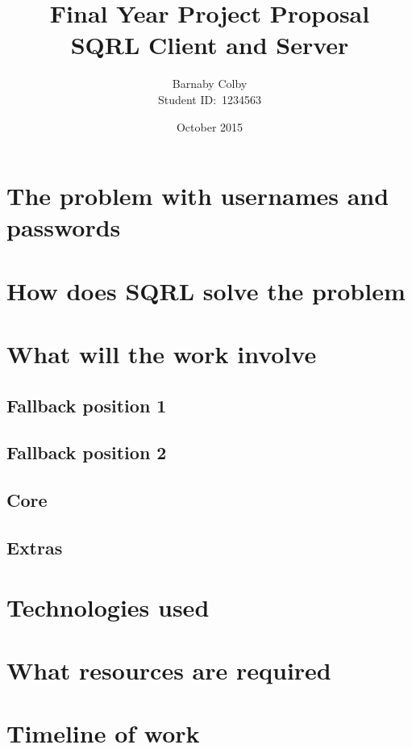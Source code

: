 \documentclass[a4paper,11pt]{article} %
\begin{document}
\title{Final Year Project Proposal\\SQRL Client and Server}
\author{Barnaby Colby\\
Student ID:\ 1234563}
\date{October 2015}
\maketitle



\section*{The problem with usernames and passwords} 
\section*{How does SQRL solve the problem} 
\section*{What will the work involve} 
    \subsection*{Fallback position 1} 
    \subsection*{Fallback position 2} 
    \subsection*{Core} 
    \subsection*{Extras} 
\section*{Technologies used} 
\section*{What resources are required} 
\section*{Timeline of work} 
\end{document}
